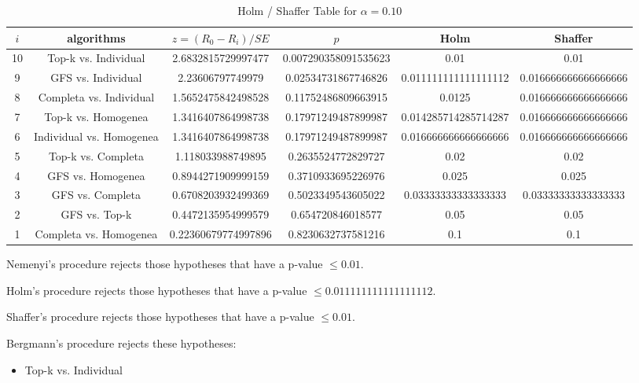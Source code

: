 \documentclass[a4paper,10pt]{article}
\begin{document}
\begin{landscape}
\begin{table}[!htp]
\centering\tiny
\caption{Holm / Shaffer Table for $\alpha=0.10$}
\begin{tabular}{cccccc}
$i$&algorithms&$z=(R_0 - R_i)/SE$&$p$&Holm&Shaffer\\
\hline
10&Top-k vs. Individual&2.6832815729997477&0.007290358091535623&0.01&0.01\\
9&GFS vs. Individual&2.23606797749979&0.02534731867746826&0.011111111111111112&0.016666666666666666\\
8&Completa vs. Individual&1.5652475842498528&0.11752486809663915&0.0125&0.016666666666666666\\
7&Top-k vs. Homogenea&1.3416407864998738&0.17971249487899987&0.014285714285714287&0.016666666666666666\\
6&Individual vs. Homogenea&1.3416407864998738&0.17971249487899987&0.016666666666666666&0.016666666666666666\\
5&Top-k vs. Completa&1.118033988749895&0.2635524772829727&0.02&0.02\\
4&GFS vs. Homogenea&0.8944271909999159&0.3710933695226976&0.025&0.025\\
3&GFS vs. Completa&0.6708203932499369&0.5023349543605022&0.03333333333333333&0.03333333333333333\\
2&GFS vs. Top-k&0.4472135954999579&0.654720846018577&0.05&0.05\\
1&Completa vs. Homogenea&0.22360679774997896&0.8230632737581216&0.1&0.1\\
\hline
\end{tabular}
\end{table}
Nemenyi's procedure rejects those hypotheses that have a p-value $\le0.01$.


Holm's procedure rejects those hypotheses that have a p-value $\le0.011111111111111112$.


Shaffer's procedure rejects those hypotheses that have a p-value $\le0.01$.


Bergmann's procedure rejects these hypotheses:


\begin{itemize}


\item Top-k vs. Individual
\end{itemize}



\end{landscape}
\end{document}
